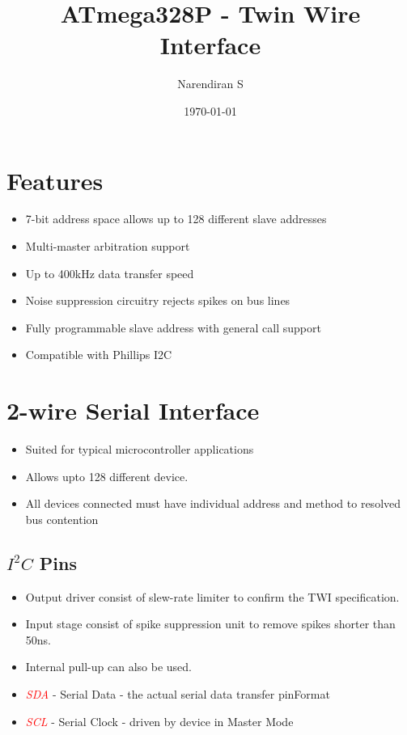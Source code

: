\documentclass{article}
\title{ATmega328P - Twin Wire Interface}
\author{Narendiran S}
\date{\today}
\newcommand{\pinFormat}[1]{\emph{\textcolor{red}{#1}}}
\begin{document}
\maketitle

\section{Features}
\begin{itemize}
    \item 7-bit address space allows up to 128 different slave addresses
    \item Multi-master arbitration support
    \item Up to 400kHz data transfer speed
    \item Noise suppression circuitry rejects spikes on bus lines
    \item Fully programmable slave address with general call support
    \item Compatible with Phillips I­2C
\end{itemize}
\section{2-wire Serial Interface}
\begin{itemize}
    \item Suited for typical microcontroller applications
    \item Allows upto  128 different device.
    \item All devices connected must have individual address and method to resolved bus contention
\end{itemize}

\subsection{\texorpdfstring{$I^2C$}{} Pins}
\begin{itemize}
    \item Output driver consist of slew-rate limiter to confirm the TWI specification.
    \item Input stage consist of spike suppression unit to remove spikes shorter than 50ns.
    \item Internal pull-up can also be used.
    \item \pinFormat{SDA} - Serial Data - the actual serial data transfer pinFormat
    \item \pinFormat{SCL} - Serial Clock - driven by device in Master Mode
\end{itemize}
\end{document}
